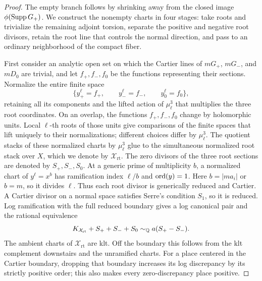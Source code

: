 \begin{proof}
The empty branch follows by shrinking away from the closed image
\(\phi(\operatorname{Supp} G_+)\).  We construct the nonempty charts in four stages:
take roots and trivialize the remaining adjoint torsion, separate the
positive and negative root divisors, retain the root line that controls the
normal direction, and pass to an ordinary neighborhood of the compact fiber.

First consider an analytic open set on which the Cartier lines of
\(mG_+\), \(mG_-\), and \(mD_0\) are trivial, and let
\(f_+,f_-,f_0\) be the functions representing their sections.  Normalize
the entire finite space
\[
 \{y_+^\ell=f_+,\qquad y_-^\ell=f_-,\qquad y_0^\ell=f_0\},
\]
retaining all its components and the lifted action of \(\mu_\ell^3\)
that multiplies the three root coordinates.  On an overlap, the functions
\(f_+,f_-,f_0\) change by holomorphic units.  Local \(\ell\)-th roots of
those units give comparisons of the finite spaces that lift uniquely to
their normalizations; different choices differ by \(\mu_\ell^3\).
The quotient stacks of these normalized charts by \(\mu_\ell^3\) glue to
the simultaneous normalized root stack over \(X\), which we denote by
\(\mathcal X_{\mathrm{rt}}\).  The zero divisors
of the three root sections are denoted by \(S_+,S_-,S_0\).  At a
generic prime of multiplicity \(b\), a normalized chart of
\(y^\ell=x^b\) has ramification index \(\ell/b\) and
\(\operatorname{ord}(y)=1\).  Here \(b=|ma_i|\) or \(b=m\), so it divides
\(\ell\).  Thus each root divisor is generically reduced and
Cartier.  A Cartier divisor on a normal space satisfies Serre's
condition \(S_1\), so it is reduced.  Log ramification with the
full reduced boundary gives a log canonical pair and the rational
equivalence
\[
 K_{\mathcal X_{\mathrm{rt}}}+S_++S_-+S_0
       \sim_{\mathbb Q}a(S_+-S_-).
\]
The ambient charts of \(\mathcal X_{\mathrm{rt}}\) are klt.  Off the
boundary this follows from
the klt complement downstairs and the unramified charts.  For a
place centered in the Cartier boundary, dropping that boundary
increases its log discrepancy by its strictly positive order;
this also makes every zero-discrepancy place positive.


\end{proof}
